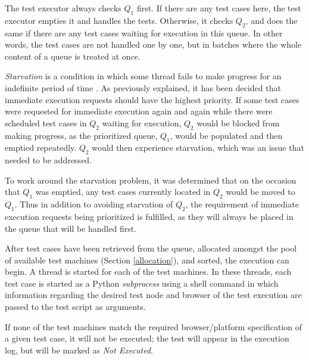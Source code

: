 The test executor always checks $Q_1$ first. If there are any test cases here, the test executor empties it and handles the tests. Otherwise, it checks $Q_2$, and does the same if there are any test cases waiting for execution in this queue. In other words, the test cases are not handled one by one, but in batches where the whole content of a queue is treated at once.

\emph{Starvation} is a condition in which some thread fails to make progress for an indefinite period of time \cite{opsys_boken}. As previously explained, it has been decided that immediate execution requests should have the highest priority. If some test cases were requested for immediate execution again and again while there were scheduled test cases in $Q_2$ waiting for execution, $Q_2$ would be blocked from making progress, as the prioritized queue, $Q_1$, would be populated and then emptied repeatedly. $Q_2$ would then experience starvation, which was an issue that needed to be addressed.

To work around the starvation problem, it was determined that on the occasion that $Q_1$ was emptied, any test cases currently located in $Q_2$ would be moved to $Q_1$. Thus in addition to avoiding starvation of $Q_2$, the requirement of immediate execution requests being prioritized is fulfilled, as they will always be placed in the queue that will be handled first. 

After test cases have been retrieved from the queue, allocated amongst the pool of available test machines (Section \ref{allocation}), and sorted, the execution can begin. A thread is started for each of the test machines. In these threads, each test case is started as a Python \emph{subprocess} using a shell command in which information regarding the desired test node and browser of the test execution are passed to the test script as arguments.


If none of the test machines match the required browser/platform specification of a given test case, it will not be executed; the test will appear in the execution log, but will be marked as \emph{Not Executed}.





